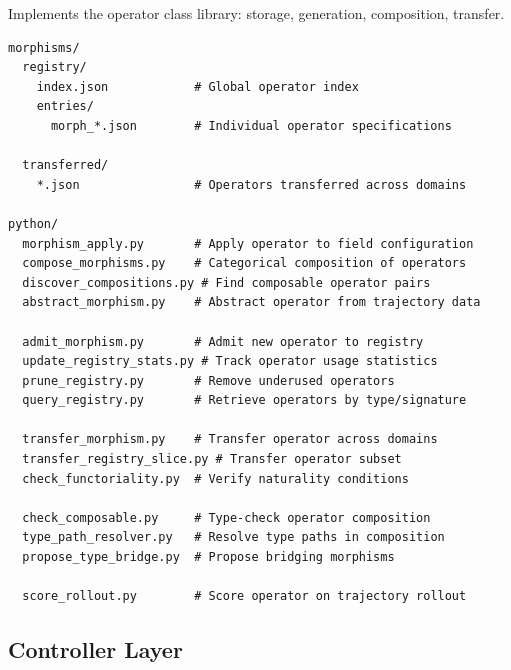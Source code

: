 \documentclass[12pt, oneside]{article}
\begin{document}
Implements the operator class library: storage, generation, composition, transfer.
\begin{verbatim}
morphisms/
  registry/
    index.json            # Global operator index
    entries/
      morph_*.json        # Individual operator specifications

  transferred/
    *.json                # Operators transferred across domains

python/
  morphism_apply.py       # Apply operator to field configuration
  compose_morphisms.py    # Categorical composition of operators
  discover_compositions.py # Find composable operator pairs
  abstract_morphism.py    # Abstract operator from trajectory data

  admit_morphism.py       # Admit new operator to registry
  update_registry_stats.py # Track operator usage statistics
  prune_registry.py       # Remove underused operators
  query_registry.py       # Retrieve operators by type/signature

  transfer_morphism.py    # Transfer operator across domains
  transfer_registry_slice.py # Transfer operator subset
  check_functoriality.py  # Verify naturality conditions

  check_composable.py     # Type-check operator composition
  type_path_resolver.py   # Resolve type paths in composition
  propose_type_bridge.py  # Propose bridging morphisms

  score_rollout.py        # Score operator on trajectory rollout
\end{verbatim}

\subsection{Controller Layer}
\end{document}

